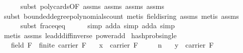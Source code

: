 \begin{isabellebody}
\ \ \ \ \isamarkupfalse%
\ {\isacharparenleft}{\kern0pt}subst\ poly{\isacharunderscore}{\kern0pt}cards{\isacharbrackleft}{\kern0pt}OF\ assms{\isacharparenleft}{\kern0pt}{}{\isacharparenright}{\kern0pt}\ assms{\isacharparenleft}{\kern0pt}{}{\isacharparenright}{\kern0pt}\ assms{\isacharparenleft}{\kern0pt}{}{\isacharparenright}{\kern0pt}\ assms{\isacharparenleft}{\kern0pt}{}{\isacharparenright}{\kern0pt}{\isacharbrackright}{\kern0pt}{\isacharparenright}{\kern0pt}\isanewline
\ \ \ \ \isamarkupfalse%
\ {\isacharparenleft}{\kern0pt}subst\ bounded{\isacharunderscore}{\kern0pt}degree{\isacharunderscore}{\kern0pt}polynomials{\isacharunderscore}{\kern0pt}count{\isacharcomma}{\kern0pt}\ metis\ field{\isachardot}{\kern0pt}is{\isacharunderscore}{\kern0pt}ring\ assms{\isacharparenleft}{\kern0pt}{}{\isacharparenright}{\kern0pt}{\isacharcomma}{\kern0pt}\ metis\ assms{\isacharparenleft}{\kern0pt}{}{\isacharparenright}{\kern0pt}{\isacharparenright}{\kern0pt}\isanewline
\ \ \ \ \isamarkupfalse%
\ {\isacharparenleft}{\kern0pt}subst\ frac{\isacharunderscore}{\kern0pt}eq{\isacharunderscore}{\kern0pt}eq{\isacharparenright}{\kern0pt}\isanewline
\ \ \ \ \isamarkupfalse%
\ {\isacharparenleft}{\kern0pt}simp\ add{\isacharcolon}{\kern0pt}a{\isacharcomma}{\kern0pt}\ simp\ add{\isacharcolon}{\kern0pt}a{\isacharcomma}{\kern0pt}\ simp{\isacharparenright}{\kern0pt}\isanewline
\ \ \ \ \isamarkupfalse%
\ {\isacharparenleft}{\kern0pt}metis\ assms{\isacharparenleft}{\kern0pt}{}{\isacharparenright}{\kern0pt}\ le{\isacharunderscore}{\kern0pt}add{\isacharunderscore}{\kern0pt}diff{\isacharunderscore}{\kern0pt}inverse{}\ power{\isacharunderscore}{\kern0pt}add{\isacharparenright}{\kern0pt}\isanewline
{}\isamarkupfalse%
%
\endisatagproof
{\isafoldproof}%
%
\isadelimproof
\isanewline
%
\endisadelimproof
\isanewline
{}\isamarkupfalse%
\ hash{\isacharunderscore}{\kern0pt}prob{\isacharunderscore}{\kern0pt}single{\isacharcolon}{\kern0pt}\isanewline
\ \ \ {\isachardoublequoteopen}field\ F\ {\isasymand}\ finite\ {\isacharparenleft}{\kern0pt}carrier\ F{\isacharparenright}{\kern0pt}{\isachardoublequoteclose}\isanewline
\ \ \ {\isachardoublequoteopen}x\ {\isasymin}\ carrier\ F{\isachardoublequoteclose}\isanewline
\ \ \ {\isachardoublequoteopen}{}\ {\isasymle}\ n{\isachardoublequoteclose}\isanewline
\ \ \ {\isachardoublequoteopen}y\ {\isasymin}\ carrier\ F{\isachardoublequoteclose}\isanewline

\end{isabellebody}
